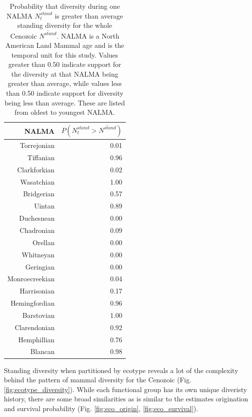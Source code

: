 \documentclass[12pt,letterpaper]{article}
\begin{document}
\begin{table}[ht]
  \centering
  \caption{Probability that diversity during one NALMA \(N^{stand}_{t}\) is greater than average standing diversity for the whole Cenozoic \(\overline{N^{stand}}\). NALMA is a North American Land Mammal age and is the temporal unit for this study. Values greater than 0.50 indicate support for the diversity at that NALMA being greater than average, while values less than 0.50 indicate support for diversity being less than average. These are listed from oldest to youngest NALMA.}
  \label{tab:div_peak}
  \begin{tabular}{ r r }
    \hline
    NALMA & \(P(N^{stand}_{t} > \overline{N^{stand}})\) \\
    \hline
    Torrejonian & 0.01 \\ 
    Tiffanian & 0.96 \\ 
    Clarkforkian & 0.02 \\ 
    Wasatchian & 1.00 \\ 
    Bridgerian & 0.57 \\ 
    Uintan & 0.89 \\ 
    Duchesnean & 0.00 \\ 
    Chadronian & 0.09 \\ 
    Orellan & 0.00 \\ 
    Whitneyan & 0.00 \\ 
    Geringian & 0.00 \\ 
    Monroecreekian & 0.04 \\ 
    Harrisonian & 0.17 \\ 
    Hemingfordian & 0.96 \\ 
    Barstovian & 1.00 \\ 
    Clarendonian & 0.92 \\ 
    Hemphillian & 0.76 \\ 
    Blancan & 0.98 \\ 
    \hline
  \end{tabular}
\end{table}


Standing diversity when partitioned by ecotype reveals a lot of the complexity behind the pattern of mammal diversity for the Cenozoic (Fig. \ref{fig:ecotype_diversity}). While each functional group has its own unique diveristy history, there are some broad similarities as is similar to the estimates origination and survival probability (Fig. \ref{fig:eco_origin}, \ref{fig:eco_survival}).
\end{document}
